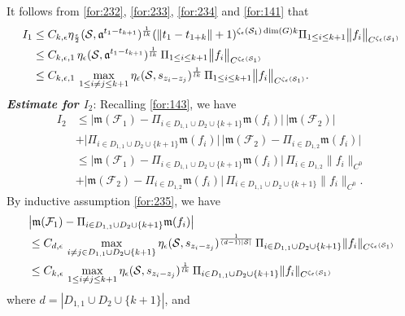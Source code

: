 \documentclass[11 pt]{amsart}
\newcommand{\norm}[1]{\lVert#1\rVert}
\theoremstyle{definition}
\numberwithin{equation}{section}
\begin{document}
It follows from \eqref{for:232}, \eqref{for:233}, \eqref{for:234} and \eqref{for:141} that
\begin{align}
 I_1&\leq  C_{k,\epsilon} \eta_{\frac{\epsilon}{2}} (\mathcal{S}, \mathfrak{a}^{t_1-t_{k+1}})^{\frac{1}{lk}}(\|t_1-t_{1+k}\|+1)^{\zeta_\epsilon(\mathcal{S}_1)\dim (G)k}\Pi_{1\leq i\leq k+1}\big\| f_i\big\|_{C^{\zeta_\epsilon(\mathcal{S}_1)}}\notag\\
 &\leq C_{k,\epsilon,1} \,\eta_{\epsilon} (\mathcal{S}, \mathfrak{a}^{t_1-t_{k+1}})^{\frac{1}{lk}}\,\Pi_{1\leq i\leq k+1}\big\| f_i\big\|_{C^{\zeta_\epsilon(\mathcal{S}_1)}}\label{for:146}\\
  &\leq C_{k,\epsilon,1} \,\max_{1\leq i\neq j\leq k+1}\eta_{\epsilon} (\mathcal{S}, s_{z_i-z_j})^{\frac{1}{lk}}\,\Pi_{1\leq i\leq k+1}\big\| f_i\big\|_{C^{\zeta_\epsilon(\mathcal{S}_1)}}.\label{for:238}
\end{align}
\textbf{\emph{Estimate for $I_2$}}: Recalling \eqref{for:143}, we have
\begin{align*}
 I_2&\leq \big|\mathfrak{m}(\mathcal{F}_1)-\Pi_{i\in D_{1,1}\cup D_2\cup \{k+1\}}\mathfrak{m}( f_i)\big|\, |\mathfrak{m}(\mathcal{F}_2)|\\
 &+\big|\Pi_{i\in D_{1,1}\cup D_2\cup \{k+1\}}\mathfrak{m}( f_i)\big|\, \big|\mathfrak{m}(\mathcal{F}_2)- \Pi_{i\in D_{1,2}}\mathfrak{m}( f_i)\big|\\
 &\leq \big|\mathfrak{m}(\mathcal{F}_1)-\Pi_{i\in D_{1,1}\cup D_2\cup \{k+1\}}\mathfrak{m}( f_i)\big| \,\Pi_{i\in D_{1,2}} \norm{f_i}_{C^0}\\
 &+ \big|\mathfrak{m}(\mathcal{F}_2)- \Pi_{i\in D_{1,2}}\mathfrak{m}( f_i)\big|\, \Pi_{i\in D_{1,1}\cup D_2\cup \{k+1\}}\norm{f_i}_{C^0}.
\end{align*}
By inductive assumption \eqref{for:235}, we have
\begin{align*}
 &\big|\mathfrak{m}(\mathcal{F}_1)-\Pi_{i\in D_{1,1}\cup D_2\cup \{k+1\}}\mathfrak{m}( f_i)\big|\notag\\
 &\leq  C_{d,\epsilon}\,\max_{i\neq j\in D_{1,1}\cup D_2\cup \{k+1\}}\eta_\epsilon (\mathcal{S}, s_{z_i-z_j})^{\frac{1}{(d-1)|\mathcal{S}|}}\,
\Pi_{i\in D_{1,1}\cup D_2\cup \{k+1\}}\norm{f_i}_{C^{\zeta_\epsilon(\mathcal{S}_1)}}\notag\\
&\leq C_{k, \epsilon}\,\max_{1\leq i\neq j\leq k+1}\eta_{\epsilon} (\mathcal{S}, s_{z_i-z_j})^{\frac{1}{lk}}\,
\Pi_{i\in D_{1,1}\cup D_2\cup \{k+1\}}\norm{f_i}_{C^{\zeta_\epsilon(\mathcal{S}_1)}}
\end{align*}
where $d=|D_{1,1}\cup D_2\cup \{k+1\}|$, and
\end{document}
